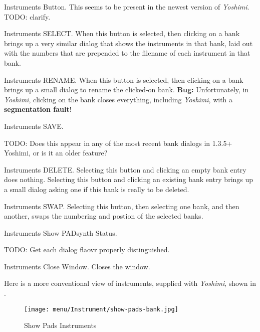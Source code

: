    Instruments Button.
   This seems to be present in the newest version of 
   \textsl{Yoshimi}.  TODO: clarify.

   Instruments SELECT.
   When this button is selected, then clicking on a bank brings
   up a very similar dialog that shows the instruments in that bank, laid
   out with the numbers that are prepended to the filename of each
   instrument in that bank.

   Instruments RENAME.
   When this button is selected, then clicking on a bank brings
   up a small dialog to rename the clicked-on bank.
   \textbf{Bug:}
   Unfortunately, in \textsl{Yoshimi}, clicking on the bank closes
   everything, including \textsl{Yoshimi}, with a
   \textbf{segmentation fault}!

   Instruments SAVE.

   TODO: Does this appear in any of the most recent bank dialogs in
   1.3.5+ Yoshimi, or is it an older feature?

   Instruments DELETE.
   Selecting this button and clicking an empty bank entry does nothing.
   Selecting this button and clicking an existing bank entry brings up a
   small dialog asking one if this bank is really to be deleted.

   Instruments SWAP.
   Selecting this button, then selecting one bank, and then another,
   swaps the numbering and postion of the selected banks.

   Instruments Show PADsynth Status.

   TODO:  Get each dialog flaovr properly distinguished.

   Instruments Close Window.
   Closes the window.

   Here is a more conventional view of instruments, supplied with
   \textsl{Yoshimi}, shown in
   .

\begin{figure}[H]
   \centering 
   \texttt{[image: menu/Instrument/show-pads-bank.jpg]}
   \caption[Show Pads Instruments]{Show Pads Instruments}
   \label{fig:show_pads_bank}
\end{figure}

